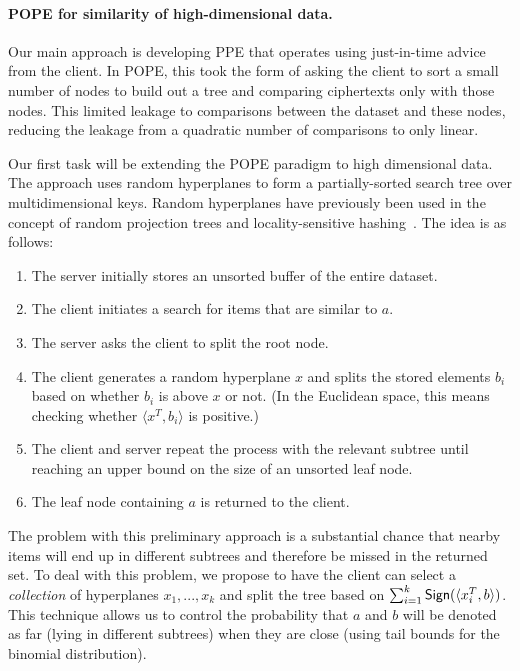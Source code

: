 \paragraph{POPE for similarity of high-dimensional data.}
Our main approach is developing PPE that operates using just-in-time
advice from the client.  In POPE, this took the form of asking the client to
sort a small number of nodes to build out a tree and comparing ciphertexts only
with those nodes.  This limited leakage to comparisons between the dataset and
these nodes, reducing the leakage from a quadratic number of
comparisons to only linear.

Our first task will be extending the POPE
paradigm to high dimensional data.  The approach uses random hyperplanes
to form a partially-sorted search tree over multidimensional keys.
Random hyperplanes
have previously been used in the concept of random projection trees and
locality-sensitive hashing~\cite{STOC:DasFre08,charikar2002similarity}.  The
idea is as follows:

\begin{enumerate}\setlength\itemsep{0em}
\item The server initially stores an unsorted buffer of the entire dataset.
\item The client initiates a search for items that are similar to $a$.
\item The server asks the client to split the root node.
\item The client generates a random hyperplane $x$ and splits 
  the stored elements $b_i$ based on whether $b_i$ is above $x$ or not.
  (In the Euclidean
    space, this means checking whether
    $\langle x^T,b_i \rangle$ is positive.)
\item The client and server repeat the process with the relevant subtree
  until reaching an upper bound on the size of an unsorted leaf node.
\item The leaf node containing $a$ is returned to the client.
\end{enumerate}

The problem with this preliminary approach is a substantial chance that
nearby items will end up in different subtrees and therefore be
missed in the returned set.
To deal with this
problem, we propose to have the client can select a \emph{collection}
of hyperplanes $x_1,..., x_k$ and
split the tree based on $\sum_{i=1}^k \mathsf{Sign}( \langle x_i^T, b \rangle )$.  This
technique allows us to control the probability that $a$ and $b$ will be denoted
as far (lying in different subtrees) when they are close (using tail bounds for
the binomial distribution). %

